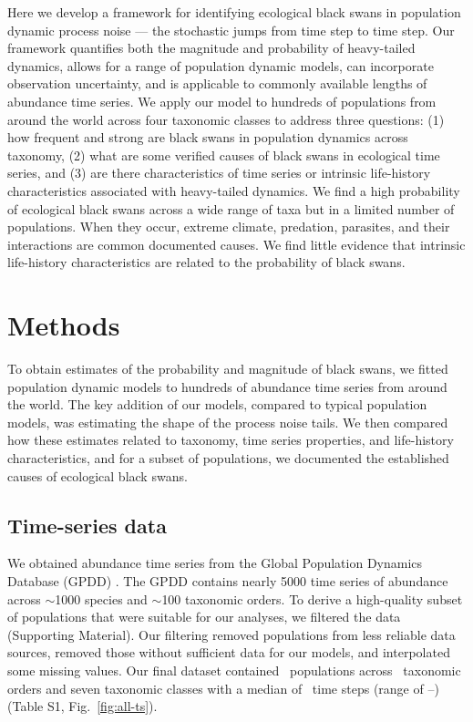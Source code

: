 Here we develop a framework for identifying ecological black swans in
population dynamic process noise --- the stochastic jumps from time step to
time step. Our framework quantifies both the magnitude and probability of
heavy-tailed dynamics, allows for a range of population dynamic models, can
incorporate observation uncertainty, and is applicable to commonly available
lengths of abundance time series. We apply our model to hundreds of populations
from around the world across four taxonomic classes to address three questions:
(1) how frequent and strong are black swans in population dynamics across
taxonomy, (2) what are some verified causes of black swans in ecological time
series, and (3) are there characteristics of time series or intrinsic
life-history characteristics associated with heavy-tailed dynamics. We find
a high probability of ecological black swans across a wide range of taxa but in
a limited number of populations. When they occur, extreme climate, predation,
parasites, and their interactions are common documented causes. We find little
evidence that intrinsic life-history characteristics are related to the
probability of black swans.

\section{Methods}

To obtain estimates of the probability and magnitude of black swans, we fitted
population dynamic models to hundreds of abundance time series from around the
world. The key addition of our models, compared to typical population models,
was estimating the shape of the process noise tails. We then compared how these
estimates related to taxonomy, time series properties, and life-history
characteristics, and for a subset of populations, we documented the established
causes of ecological black swans.

\subsection{Time-series data}

We obtained abundance time series from the Global Population Dynamics Database
(GPDD) \citep{gpdd2010}. The GPDD contains nearly 5000 time series of abundance
across $\sim$1000 species and $\sim$100 taxonomic orders. To derive
a high-quality subset of populations that were suitable for our analyses, we
filtered the data (Supporting Material). Our filtering removed populations from
less reliable data sources, removed those without sufficient data for our
models, and interpolated some missing values. Our final dataset contained
\NPops~populations across \NOrders~taxonomic orders and seven taxonomic classes
with a median of \medianTimeSteps~time steps (range of
\minTimeSteps--\maxTimeSteps) (Table S1, Fig.~\ref{fig:all-ts}).


